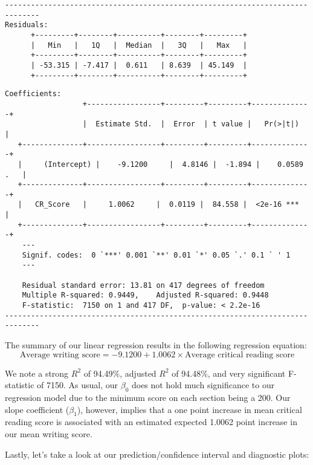 \documentclass[11pt]{article} %
\begin{document}
\begin{verbatim}
------------------------------------------------------------------------------
Residuals:
	  +---------+--------+----------+--------+---------+  
	  |   Min   |   1Q   |  Median  |   3Q   |   Max   |
	  +---------+--------+----------+--------+---------+  
	  | -53.315 | -7.417 |  0.611   | 8.639  | 45.149  |
	  +---------+--------+----------+--------+---------+ 
\end{verbatim}
\newpage
\begin{verbatim}
Coefficients:
                  +-----------------+---------+---------+--------------+
                  |  Estimate Std.  |  Error  | t value |   Pr(>|t|)   |
   +--------------+-----------------+---------+---------+--------------+
   |	 (Intercept) |    -9.1200     |  4.8146 |  -1.894 |    0.0589 .   |
   +--------------+-----------------+---------+---------+--------------+
   |   CR_Score   |     1.0062     |  0.0119 |  84.558 |  <2e-16 ***  |
   +--------------+-----------------+---------+---------+--------------+
    ---
    Signif. codes:  0 `***' 0.001 `**' 0.01 `*' 0.05 `.' 0.1 ` ' 1
    ---
	
    Residual standard error: 13.81 on 417 degrees of freedom
    Multiple R-squared: 0.9449,    Adjusted R-squared: 0.9448 
    F-statistic:  7150 on 1 and 417 DF,  p-value: < 2.2e-16
------------------------------------------------------------------------------
\end{verbatim}
The summary of our linear regression results in the following regression equation:
\[ \text{Average writing score} = -9.1200 + 1.0062 \times \text{Average critical reading score}\]

We note a strong $R^{2}$ of 94.49\%, adjusted $R^{2}$ of 94.48\%, and very significant F-statistic of 7150. As usual, our $\beta_0$ does not hold much significance to our regression model due to the minimum score on each section being a 200. Our slope coefficient ($\beta_1$), however, implies that a one point increase in mean critical reading score is associated with an estimated expected 1.0062 point increase in our mean writing score.\par
Lastly, let's take a look at our prediction/confidence interval and diagnostic plots:

%
\end{document}
